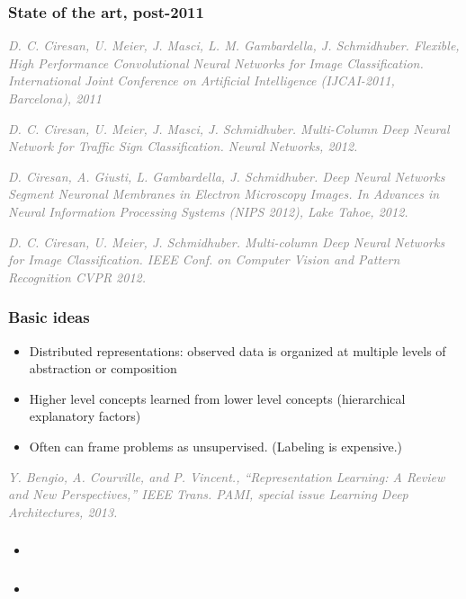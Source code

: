 \documentclass{beamer}
\newcommand\smallgray[1]{\textcolor{gray}{\small\it #1}}
\newcommand\prevwork[1]{\smallgray{#1}}
\begin{document}
\begin{frame}
  \frametitle{State of the art, post-2011}
  
  \prevwork{D. C. Ciresan, U. Meier, J. Masci, L. M. Gambardella,
    J. Schmidhuber. Flexible, High Performance Convolutional Neural
    Networks for Image Classification. International Joint Conference
    on Artificial Intelligence (IJCAI-2011, Barcelona), 2011}

  \prevwork{D. C. Ciresan, U. Meier, J. Masci,
    J. Schmidhuber. Multi-Column Deep Neural Network for Traffic Sign
    Classification. Neural Networks, 2012.}

  \prevwork{D. Ciresan, A. Giusti, L. Gambardella,
    J. Schmidhuber. Deep Neural Networks Segment Neuronal Membranes in
    Electron Microscopy Images. In Advances in Neural Information
    Processing Systems (NIPS 2012), Lake Tahoe, 2012.}

  \prevwork{D. C. Ciresan, U. Meier, J. Schmidhuber. Multi-column Deep
    Neural Networks for Image Classification. IEEE Conf. on Computer
    Vision and Pattern Recognition CVPR 2012.}

\end{frame}

\begin{frame}
  \frametitle{Basic ideas}
  \begin{itemize}
  \item Distributed representations: observed data is organized at
    multiple levels of abstraction or composition
  \item Higher level concepts learned from lower level concepts
    (hierarchical explanatory factors)
  \item Often can frame problems as unsupervised.  (Labeling is
    expensive.)
  \end{itemize}
  
  \prevwork{Y. Bengio, A. Courville, and P. Vincent., ``Representation
    Learning: A Review and New Perspectives,'' IEEE Trans. PAMI,
    special issue Learning Deep Architectures, 2013.}
\end{frame}

\begin{frame}
  \frametitle{}
  \begin{itemize}
  \item 
  \end{itemize}
\end{frame}

\begin{frame}
  \frametitle{}
  \begin{itemize}
  \item 
  \end{itemize}
\end{frame}
\end{document}
